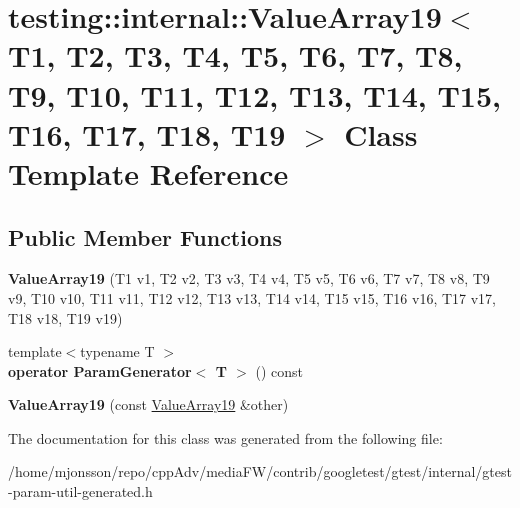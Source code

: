 \hypertarget{classtesting_1_1internal_1_1ValueArray19}{}\section{testing\+:\+:internal\+:\+:Value\+Array19$<$ T1, T2, T3, T4, T5, T6, T7, T8, T9, T10, T11, T12, T13, T14, T15, T16, T17, T18, T19 $>$ Class Template Reference}
\label{classtesting_1_1internal_1_1ValueArray19}
\subsection*{Public Member Functions}
\begin{DoxyCompactItemize}
\item 
\mbox{\label{classtesting_1_1internal_1_1ValueArray19_a1ffcdacd1ffb1d6718187a66458c09e2}} 
{\bfseries Value\+Array19} (T1 v1, T2 v2, T3 v3, T4 v4, T5 v5, T6 v6, T7 v7, T8 v8, T9 v9, T10 v10, T11 v11, T12 v12, T13 v13, T14 v14, T15 v15, T16 v16, T17 v17, T18 v18, T19 v19)
\item 
\mbox{\label{classtesting_1_1internal_1_1ValueArray19_a8ddd6c1de46e25310cf844895c7c8cf6}} 
{\footnotesize template$<$typename T $>$ }\\{\bfseries operator Param\+Generator$<$ T $>$} () const
\item 
\mbox{\label{classtesting_1_1internal_1_1ValueArray19_a1029ebc5d39633e2fb278e051d0ec1d0}} 
{\bfseries Value\+Array19} (const \hyperlink{classtesting_1_1internal_1_1ValueArray19}{Value\+Array19} \&other)
\end{DoxyCompactItemize}


The documentation for this class was generated from the following file\+:\begin{DoxyCompactItemize}
\item 
/home/mjonsson/repo/cpp\+Adv/media\+F\+W/contrib/googletest/gtest/internal/gtest-\/param-\/util-\/generated.\+h\end{DoxyCompactItemize}
